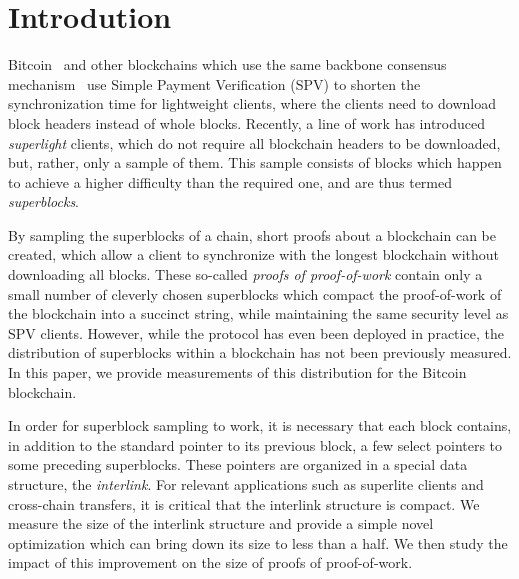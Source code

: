 \section{Introdution}

Bitcoin~\cite{bitcoin} and other blockchains which use the same backbone
consensus mechanism~\cite{EC:GarKiaLeo15} use Simple Payment Verification (SPV)
to shorten the synchronization time for lightweight clients, where the clients
need to download block headers instead of whole blocks. Recently, a line of
work has introduced \emph{superlight} clients, which do not require all
blockchain headers to be downloaded, but, rather, only a sample of them. This
sample consists of blocks which happen to achieve a higher difficulty than the
required one, and are thus termed \emph{superblocks}.

By sampling the superblocks of a chain, short proofs about a blockchain can be
created, which allow a client to synchronize with the longest blockchain without
downloading all blocks. These so-called \emph{proofs of proof-of-work} contain
only a small number of cleverly chosen superblocks which compact the
proof-of-work of the blockchain into a succinct string, while maintaining the
same security level as SPV clients. However, while the protocol has even been deployed in
practice, the distribution of superblocks within a blockchain has not been
previously measured. In this paper, we provide measurements of this distribution for the
Bitcoin blockchain.

In order for superblock sampling to work, it is necessary that each block
contains, in addition to the standard pointer to its previous block, a few
select pointers to some preceding superblocks. These pointers are organized in a
special data structure, the \emph{interlink}. For relevant applications such as
superlite clients and cross-chain transfers, it is critical that the interlink
structure is compact. We measure the size of the interlink structure and provide
a simple novel optimization which can bring down its size to less than a
half. We then study the impact of this improvement on the size of proofs of
proof-of-work.

